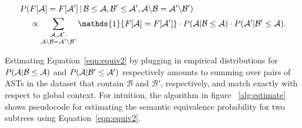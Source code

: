 {\scriptsize
\begin{align}
P(&F[\AST] = F[\AST'] \,|\, \mathcal{B}\leq \AST, \mathcal{B}' \leq \AST', \AST\backslash \mathcal{B} =\AST'\backslash \mathcal{B}')  \\
 &\propto \sum_{\substack{\AST,\AST': \\ \AST\backslash \mathcal{B} = \AST'\backslash\mathcal{B'}}} \mathds{1}\{F[\AST] = F[\AST'] \}  \cdot P(\AST | \mathcal{B}\leq\AST) \cdot P(\AST'|\mathcal{B}'\leq \mathcal{A}) \label{eqn:equiv2}.
\end{align}
}

Estimating Equation~\ref{eqn:equiv2}  by plugging  in empirical distributions for $P(\mathcal{A} | \mathcal{B}\leq\mathcal{A}) $ and $P(\mathcal{A} | \mathcal{B}'\leq\mathcal{A}')$ 
respectively amounts to summing over pairs of ASTs in the dataset that contain $\mathcal{B}$ and $\mathcal{B}'$, respectively, and match exactly
with respect to global context.
For intuition, the algorithm in figure ~\ref{alg:estimate} shows pseudocode for estimating the semantic equivalence
probability for two subtrees using Equation~\ref{eqn:equiv2}.  

